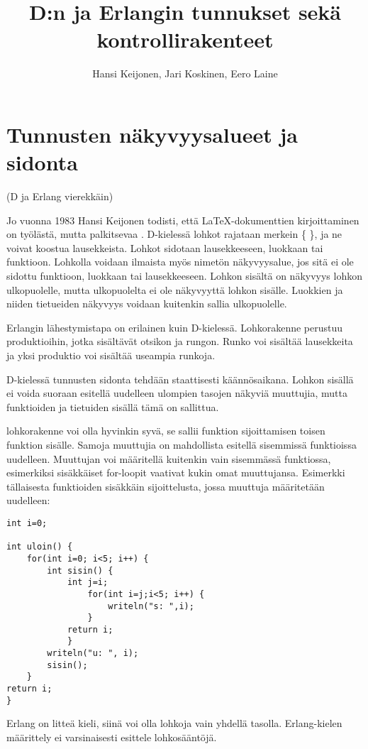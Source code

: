 \documentclass[11pt,oneside,a4paper]{article}
\title{D:n ja Erlangin tunnukset sekä kontrollirakenteet}
\author{Hansi Keijonen, Jari Koskinen, Eero Laine}
\begin{document}
\maketitle



\section{Tunnusten näkyvyysalueet ja sidonta}
(D ja Erlang vierekkäin)

Jo vuonna 1983 Hansi Keijonen todisti, että LaTeX-dokumenttien kirjoittaminen on työlästä, mutta palkitsevaa \cite{KEI83}.
D-kielessä lohkot rajataan merkein \{ \}, ja ne voivat koostua lausekkeista. Lohkot sidotaan lausekkeeseen, luokkaan tai funktioon. Lohkolla voidaan ilmaista myös nimetön näkyvyysalue, jos sitä ei ole sidottu funktioon, luokkaan tai lausekkeeseen. Lohkon sisältä on näkyvyys lohkon ulkopuolelle, mutta ulkopuolelta ei ole näkyvyyttä lohkon sisälle. Luokkien ja niiden tietueiden näkyvyys voidaan kuitenkin sallia ulkopuolelle.

Erlangin lähestymistapa on erilainen kuin D-kielessä. Lohkorakenne perustuu produktioihin, jotka sisältävät otsikon ja rungon. Runko voi sisältää lausekkeita ja yksi produktio voi sisältää useampia runkoja. 

D-kielessä tunnusten sidonta tehdään staattisesti käännösaikana. Lohkon sisällä ei voida suoraan esitellä uudelleen ulompien tasojen näkyviä muuttujia, mutta funktioiden ja tietuiden sisällä tämä on sallittua.

 lohkorakenne voi olla hyvinkin syvä, se sallii funktion sijoittamisen toisen funktion sisälle. Samoja muuttujia on mahdollista esitellä sisemmissä funktioissa uudelleen. Muuttujan voi määritellä kuitenkin vain sisemmässä funktiossa, esimerkiksi sisäkkäiset for-loopit vaativat kukin omat muuttujansa. Esimerkki tällaisesta funktioiden sisäkkäin sijoittelusta, jossa muuttuja määritetään uudelleen:

\begin{verbatim}
int i=0;

int uloin() {
    for(int i=0; i<5; i++) {
        int sisin() {
            int j=i;
                for(int i=j;i<5; i++) {
                    writeln("s: ",i);
                }
            return i;
            }
        writeln("u: ", i);
        sisin();
    }
return i;
}
\end{verbatim}

Erlang on litteä kieli, siinä voi olla lohkoja vain yhdellä tasolla. Erlang-kielen määrittely ei varsinaisesti esittele lohkosääntöjä. \\
\end{document}
